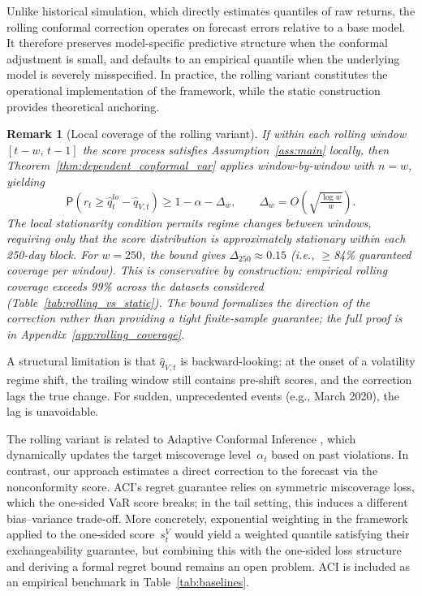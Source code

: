 \documentclass[preprint,11pt,authoryear]{elsarticle}
\newtheorem{remark}[theorem]{Remark}
\renewcommand{\P}{\mathsf{P}}
\newcommand{\1}{\boldsymbol{1}}
\begin{document}
	Unlike historical simulation, which directly estimates quantiles of raw returns, the rolling conformal correction operates on forecast errors relative to a base model. It therefore preserves model-specific predictive structure when the conformal adjustment is small, and defaults to an empirical quantile when the underlying model is severely misspecified.
	In practice, the rolling variant constitutes the operational implementation of the framework, while the static construction provides theoretical anchoring.

	\begin{remark}[Local coverage of the rolling variant]
		\label{rem:rolling_coverage}
		If within each rolling window $[t-w,\, t-1]$ the score process satisfies Assumption~\ref{ass:main} locally, then Theorem~\ref{thm:dependent_conformal_var} applies window-by-window with $n = w$, yielding
		\[
		\P\!\left(r_t \geq \hat{q}_t^{lo} - \hat{q}_{V,t}\right) \geq 1 - \alpha - \Delta_w, \qquad \Delta_w = O\!\left(\sqrt{\tfrac{\log w}{w}}\right).
		\]
		The local stationarity condition permits regime changes \emph{between} windows, requiring only that the score distribution is approximately stationary within each 250-day block. For $w = 250$, the bound gives $\Delta_{250} \approx 0.15$ (i.e., $\geq$84\% guaranteed coverage per window). This is conservative by construction: empirical rolling coverage exceeds 99\% across the datasets considered (Table~\ref{tab:rolling_vs_static}). The bound formalizes the direction of the correction rather than providing a tight finite-sample guarantee; the full proof is in Appendix~\ref{app:rolling_coverage}.
	\end{remark}

	A structural limitation is that $\hat{q}_{V,t}$ is
	backward-looking: at the onset of a volatility regime
	shift, the trailing window still contains pre-shift
	scores, and the correction lags the true change.
	For sudden, unprecedented
	events (e.g., March 2020), the lag is unavoidable.

	The rolling variant is related to Adaptive Conformal Inference \citep{gibbs2021adaptive}, which dynamically updates the target miscoverage level~$\alpha_t$ based on past violations. In contrast, our approach estimates a direct correction to the forecast via the nonconformity score. ACI's regret guarantee relies on symmetric miscoverage loss, which the one-sided VaR score breaks; in the tail setting, this induces a different bias--variance trade-off. More concretely, exponential weighting in the \citet{barber2023conformal} framework applied to the one-sided score~$s_t^V$ would yield a weighted quantile satisfying their exchangeability guarantee, but combining this with the one-sided loss structure and deriving a formal regret bound remains an open problem. ACI is included as an empirical benchmark in Table~\ref{tab:baselines}.
\end{document}
